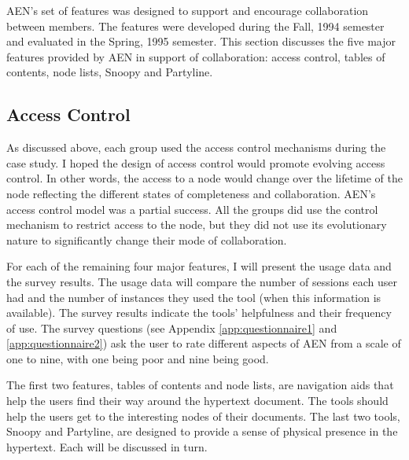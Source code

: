 AEN's set of features was designed to support and encourage collaboration
between members.  The features were developed during the Fall, 1994 semester
and evaluated in the Spring, 1995 semester.  This section discusses the
five major features provided by AEN in support of collaboration: access
control, tables of contents, node lists, Snoopy and Partyline.


\subsection{Access Control}

As discussed above, each group used the access control mechanisms during
the case study.  I hoped the design of access control would promote
evolving access control.  In other words, the access to a node would change
over the lifetime of the node reflecting the different states of
completeness and collaboration.  AEN's access control model was a partial
success.  All the groups did use the control mechanism to restrict access
to the node, but they did not use its evolutionary nature to significantly
change their mode of collaboration.


For each of the remaining four major features, I will present the usage
data and the survey results.  The usage data will compare the number of
sessions each user had and the number of instances they used the tool (when
this information is available).  The survey results indicate the tools'
helpfulness and their frequency of use.  The survey questions (see Appendix
\ref{app:questionnaire1} and \ref{app:questionnaire2}) ask the user to rate
different aspects of AEN from a scale of one to nine, with one being poor
and nine being good.

The first two features, tables of contents and node lists, are
navigation aids that help the users find their way around the hypertext
document.  The tools should help the users get to the interesting nodes of
their documents.  The last two tools, Snoopy and Partyline, are designed to
provide a sense of physical presence in the hypertext.  Each will be
discussed in turn.

\newpage
